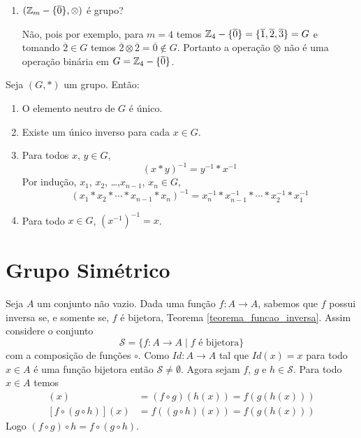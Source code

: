 \begin{exemplos}
\begin{enumerate}[label={\arabic*})]
        \item $(\mathbb{Z}_m-\{\overline{0}\},\otimes)$ {\'e} grupo?
        \begin{solucao}
            N\~ao, pois por exemplo, para $m = 4$ temos $\mathbb{Z}_4-\{\overline{0}\} = \{\overline{1}, \overline{2}, \overline{3}\} = G$ e tomando $\overline{2}\in G$ temos $\overline{2} \otimes \overline{2} = \overline{0} \notin G$. Portanto a opera\c{c}\~ao $\otimes$ n\~ao \'e uma opera\c{c}\~ao bin\'aria em $G = \mathbb{Z}_4 - \{\overline{0}\}$.
        \end{solucao}
    \end{enumerate}
\end{exemplos}

\begin{proposicao}
    Seja $(G,*)$ um grupo. Ent\~ao:
    \begin{enumerate}[label={\roman*})]
        \item O elemento neutro de $G$ {\'e} {\'u}nico.

        \item Existe um {\'u}nico inverso para cada $x \in G$.

        \item Para todos $x$, $y \in G$,
        \[
            (x*y)^{-1} = y^{-1}*x^{-1}
        \]
        Por indu{\c c}{\~a}o, $x_1$, $x_2$, \dots ,$x_{n-1}$, $x_n \in G$,
        \[
            (x_1*x_2*\cdots *x_{n-1}*x_{n})^{-1} = x^{-1}_{n}*x^{-1}_{n-1}*\cdots *x^{-1}_2*x^{-1}_1
        \]
        \item Para todo $x \in G$, $(x^{-1})^{-1} = x$.
    \end{enumerate}
\end{proposicao}


\section{Grupo Sim\'etrico} %
\label{sec:grupo_sim\'etrico}

Seja $A$ um conjunto n\~ao vazio. Dada uma fun\c{c}\~ao $f : A \to A$, sabemos que $f$ possui inversa se, e somente se, $f$ \'e bijetora, Teorema \ref{teorema_funcao_inversa}. Assim considere o conjunto
\[
    \mathcal{S} = \{ f : A \to A \mid f \mbox{ \'e bijetora}\}
\]
com a composi\c{c}\~ao de fun\c{c}\~oes $\circ$. Como $Id : A \to A$ tal que $Id(x) = x$ para todo $x \in A$ \'e uma fun\c{c}\~ao bijetora ent\~ao $\mathcal{S} \ne \emptyset$. Agora sejam $f$, $g$ e $h \in \mathcal{S}$. Para todo $x \in A$ temos
\begin{align*}
    [(f\circ g)\circ h](x) &= (f \circ g)(h(x)) = f(g(h(x)))\\
    [f\circ(g\circ h)](x) &= f((g\circ h)(x)) = f(g(h(x)))
\end{align*}
Logo $(f\circ g)\circ h = f\circ(g\circ h)$.

